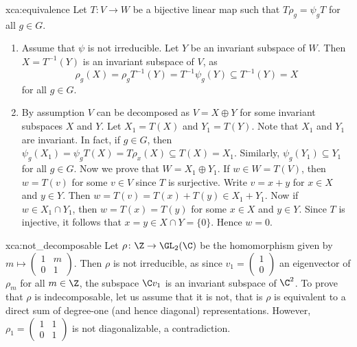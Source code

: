 \begin{sol}{xca:equivalence}
Let $T\colon V\to W$ be a bijective linear map such that $T\rho_g=\psi_gT$ for all $g\in G$. 
\begin{enumerate}
	\item Assume that $\psi$ is not irreducible. Let $Y$ be an invariant subspace of $W$. 
		Then $X=T^{-1}(Y)$ is an invariant subspace of $V$, as 
		\[
		\rho_g(X)=\rho_gT^{-1}(Y)=T^{-1}\psi_g(Y)\subseteq T^{-1}(Y)=X
		\]
		for all $g\in G$. 
	\item By assumption
		$V$ can be decomposed as $V=X\oplus Y$ for some invariant subspaces $X$ and $Y$. Let $X_1=T(X)$ 
		and $Y_1=T(Y)$. 
		Note that $X_1$ and $Y_1$ are invariant. In fact, if $g\in G$, then  
		$\psi_g(X_1)=\psi_g T(X)=T\rho_x(X)\subseteq T(X)=X_1$.
		Similarly, $\psi_g(Y_1)\subseteq Y_1$ 
		for all $g\in G$. Now we prove that $W=X_1\oplus Y_1$. If $w\in W=T(V)$, then 
		$w=T(v)$ for some $v\in V$ since $T$ is surjective. Write $v=x+y$ for $x\in X$ and $y\in Y$. Then 
		$w=T(v)=T(x)+T(y)\in X_1+Y_1$. Now if $w\in X_1\cap Y_1$, then $w=T(x)=T(y)$ for some $x\in X$ and
		$y\in Y$. Since $T$ is injective, it follows that $x=y\in X\cap Y=\{0\}$. Hence $w=0$. 
	\end{enumerate}	
\end{sol}

\begin{sol}{xca:not_decomposable}
    Let $\rho\colon \Z\to\GL_2(\C)$ be the homomorphism given by 
    $m\mapsto\begin{pmatrix}1&m\\0&1\end{pmatrix}$. Then $\rho$ is not irreducible, as
    since $v_1=\begin{pmatrix}1\\0\end{pmatrix}$
    an eigenvector of $\rho_m$ for all $m\in\Z$, 
    the subspace $\C v_1$ is an invariant subspace of $\C^2$. To prove that $\rho$ is 
    indecomposable, let us assume that 
    it is not, that is $\rho$ is equivalent to a direct sum of degree-one (and hence diagonal) 
    representations. However, $\rho_1=\begin{pmatrix}1&1\\0&1\end{pmatrix}$ is not diagonalizable, 
    a contradiction. 
\end{sol}



